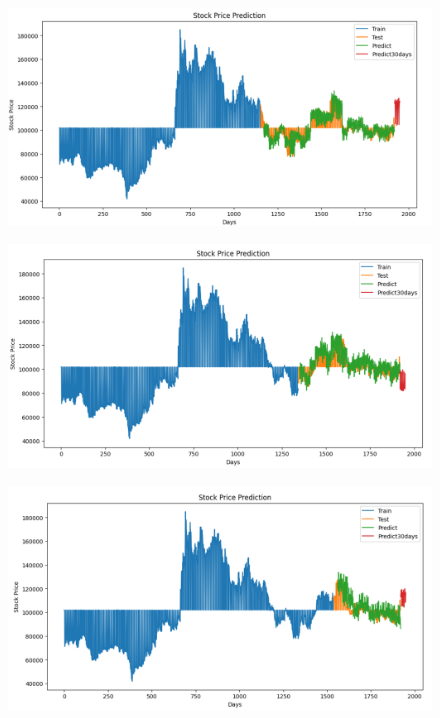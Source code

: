 \documentclass{article}
\begin{document}
\begin{multicols}{2}
\begin{figure}[H]
    \centering
    \begin{minipage}{0.15\textwidth}
    \centering
    \includegraphics[width=1\textwidth]{Image/N_Beat/N_BEAT_6_4_LG_30DAYS.png}
   
    \label{fig:1}
    \end{minipage}%
    \begin{minipage}{0.15\textwidth}
    \centering
    \includegraphics[width=1\textwidth]{Image/N_Beat/N_BEAT_7_3_LG_30DAYS.png}
  
    \label{fig:2}
    \end{minipage}%
    \begin{minipage}{0.15\textwidth}
    \centering
    \includegraphics[width=1\textwidth]{Image/N_Beat/N_BEAT_8_2_LG_30DAYS.png}


\end{minipage}
\end{figure}
\end{multicols}
\end{document}
